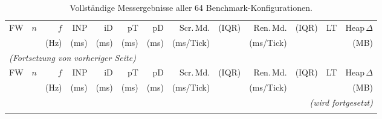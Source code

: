 \begin{landscape}
{\scriptsize
\begin{longtable}{@{}l r r r  r r r  r r  r r  r r@{}}
  \caption{Vollständige Messergebnisse aller 64 Benchmark-Konfigurationen.}%
  \label{tab:appendix-benchmark} \\
  \toprule
  FW & $n$ & $f$ & INP
     & iD & pT & pD
     & Scr.\,Md. & (IQR)
     & Ren.\,Md. & (IQR)
     & LT & Heap\,$\Delta$ \\
     & & (Hz) & (ms) & (ms) & (ms) & (ms)
     & (ms/Tick) & & (ms/Tick) & & & (MB) \\
  \midrule
\endfirsthead
  \multicolumn{13}{l}{\footnotesize\itshape (Fortsetzung von vorheriger Seite)} \\[2pt]
  \toprule
  FW & $n$ & $f$ & INP
     & iD & pT & pD
     & Scr.\,Md. & (IQR)
     & Ren.\,Md. & (IQR)
     & LT & Heap\,$\Delta$ \\
     & & (Hz) & (ms) & (ms) & (ms) & (ms)
     & (ms/Tick) & & (ms/Tick) & & & (MB) \\
  \midrule
\endhead
  \midrule
  \multicolumn{13}{r}{\footnotesize\itshape (wird fortgesetzt)} \\
\endfoot
  \bottomrule
\endlastfoot


\end{longtable}}
\end{landscape}
